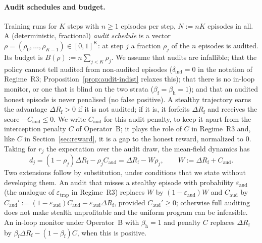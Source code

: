 \paragraph{Audit schedules and budget.} Training runs for $K$ steps with
$n\ge1$ episodes per step, $N:=nK$ episodes in all. A (deterministic,
fractional) \emph{audit schedule} is a vector
$\rho=(\rho_0,\dots,\rho_{K-1})\in[0,1]^K$: at step $j$ a fraction $\rho_j$ of
the $n$ episodes is audited. Its budget is $B(\rho):=n\sum_{j<K}\rho_j$. We
assume that audits are infallible; that the policy cannot tell audited from
non-audited episodes ($\delta_{\mathrm{ind}}=0$ in the notation of Regime~R3;
Proposition~\ref{prop:audit-indist} relaxes this); that there is no in-loop
monitor, or one that is blind on the two strata
($\beta_{\mathrm f}=\beta_{\mathrm h}=1$); and that an audited honest episode
is never penalised (no false positive). A stealthy trajectory earns the
advantage $\Delta R_{\mathrm f}>0$ if it is not audited; if it is, it forfeits
$\Delta R_{\mathrm f}$ and receives the score $-C_{\mathrm{aud}}\le0$. We
write $C_{\mathrm{aud}}$ for this audit penalty, to keep it apart from the
interception penalty $C$ of Operator~B; it plays the role of $C$ in Regime~R3
and, like $C$ in Section~\ref{sec:reward}, it is a gap to the honest reward,
normalized to $0$. Taking for $r_j$ the expectation over the audit draw, the
mean-field dynamics has
\begin{equation}\label{eq:audit-adv}
  d_j=(1-\rho_j)\Delta R_{\mathrm f}-\rho_j C_{\mathrm{aud}}
     =\Delta R_{\mathrm f}-W\rho_j,\qquad W:=\Delta R_{\mathrm f}+C_{\mathrm{aud}} .
\end{equation}
Two extensions follow by substitution, under conditions that we state without
developing them. An audit that misses a stealthy episode with probability
$\varepsilon_{\mathrm{aud}}$ (the analogue of $\varepsilon_{\mathrm{trap}}$ in
Regime~R3) replaces $W$ by $(1-\varepsilon_{\mathrm{aud}})W$ and
$C_{\mathrm{aud}}$ by
$C_{\mathrm{aud}}':=(1-\varepsilon_{\mathrm{aud}})C_{\mathrm{aud}}-\varepsilon_{\mathrm{aud}}\Delta R_{\mathrm f}$,
provided $C_{\mathrm{aud}}'\ge0$; otherwise full auditing does not make
stealth unprofitable and the uniform program can be infeasible. An in-loop
monitor under Operator~B with $\beta_{\mathrm h}=1$ and penalty $C$ replaces
$\Delta R_{\mathrm f}$ by
$\beta_{\mathrm f}\Delta R_{\mathrm f}-(1-\beta_{\mathrm f})C$, when this is
positive.

